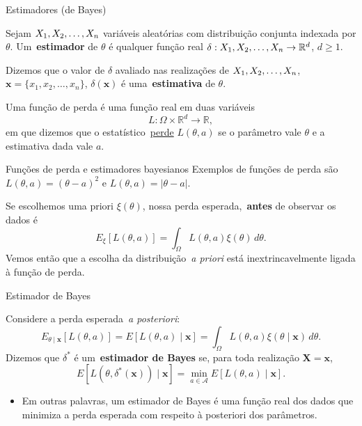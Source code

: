 \begin{frame}{Estimadores (de Bayes)}

\begin{defn}[Estimador]
Sejam $X_1, X_2, \ldots, X_n$ variáveis aleatórias com distribuição conjunta indexada por $\theta$.
Um~\textbf{estimador} de $\theta$ é qualquer função real $\delta: X_1, X_2, \ldots, X_n \to \mathbb{R}^d$, $d\geq 1$. 
\end{defn}
\begin{defn}[Estimativa]
Dizemos que o valor de $\delta$ avaliado nas realizações de $X_1, X_2, \ldots, X_n$, $\boldsymbol x = \{ x_1, x_2, \ldots, x_n\}$,  $\delta(\boldsymbol{x})$ é uma~\textbf{estimativa} de $\theta$.
\end{defn}

\begin{defn}
Uma função de perda é uma função real em duas variáveis 
\[ L : \Omega \times \mathbb{R}^d \to \mathbb{R}, \]
em que dizemos que o estatístico~\underline{perde} $L(\theta, a)$ se o parâmetro vale $\theta$ e a estimativa dada vale $a$.
\end{defn} 
\end{frame}

\begin{frame}{Funções de perda e estimadores bayesianos}
Exemplos de funções de perda são $L(\theta, a) = (\theta-a)^2$ e $L(\theta, a) = |\theta-a|$.
\begin{obs}
Se escolhemos uma priori $\xi(\theta)$, nossa perda esperada,~\textbf{antes} de observar os dados é
\begin{equation*}
 E_\xi[L(\theta, a)] = \int_{\Omega} L(\theta, a)\xi(\theta)\,d\theta.
\end{equation*}
Vemos então que a escolha da distribuição~\textit{a priori} está inextrincavelmente ligada à função de perda.
\end{obs}
\end{frame}

\begin{frame}{Estimador de Bayes}
 \begin{defn}
  Considere a perda esperada~\textit{a posteriori}:
  \begin{equation*}
   E_{\theta \mid \boldsymbol{x}}\left[L(\theta, a) \right] = E[L(\theta, a) \mid \boldsymbol{x}] = \int_{\Omega} L(\theta, a)\xi(\theta \mid \boldsymbol{x})\, d\theta. 
  \end{equation*}
Dizemos que $\delta^\ast$ é um~\textbf{estimador de Bayes} se, para toda realização $\boldsymbol{X} = \boldsymbol{x}$,
\begin{equation*}
 E[L(\theta, \delta^\ast(\boldsymbol{x}) ) \mid \boldsymbol{x}] = \min_{a \in \mathcal{A}}   E[L(\theta, a) \mid \boldsymbol{x}].
\end{equation*}
 \end{defn}
\begin{itemize}
 \item Em outras palavras, um estimador de Bayes é uma função real dos dados que minimiza a perda esperada com respeito à posteriori dos parâmetros.
\end{itemize} 
\end{frame}

